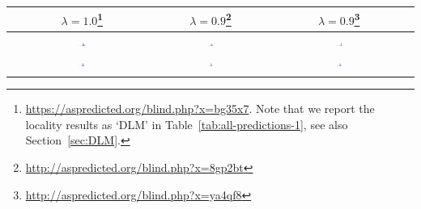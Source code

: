 \documentclass[10pt,twoside,lineno]{article}
\begin{document}
\begin{table}[hbt!]
	\begin{center}
\small{
\begin{tabular}{|c|ccc|c}
	\hline
& $\lambda=1.0$\footnote{\url{https://aspredicted.org/blind.php?x=bg35x7}. Note that we report the locality results as `DLM' in Table~\ref{tab:all-predictions-1}, see also Section~\ref{sec:DLM}.} 
& $\lambda=0.9$\footnote{\url{http://aspredicted.org/blind.php?x=8gp2bt}}
& $\lambda=0.9$\footnote{\url{http://aspredicted.org/blind.php?x=ya4qf8}} \\ \hline \hline 
	\multirow{2}{*}{\raisebox{.5pt}{\textcircled{\raisebox{-.9pt} {1}}}}		  
		&   \multirow{2}{*}{  \includegraphics[width=0.06\textwidth]{../results/correlations/figures/posteriors/posterior_first10_Efficiency_lifted_case.pdf}     } 
 		&   \multirow{2}{*}{  \includegraphics[width=0.06\textwidth]{../results/correlations/figures/posteriors/posterior_first09_Efficiency_lifted_case.pdf}     }  
		&   \multirow{2}{*}{  \includegraphics[width=0.06\textwidth]{../results/correlations/figures/posteriors/posterior_Efficiency_lifted_case.pdf}     }  \\
&&&\\ \hline
	\multirow{2}{*}{\raisebox{.5pt}{\textcircled{\raisebox{-.9pt} {2}}}}	 
		&   \multirow{2}{*}{  \includegraphics[width=0.06\textwidth]{../results/correlations/figures/posteriors/posterior_first10_Efficiency_lifted_cop.pdf}     }  
		&   \multirow{2}{*}{  \includegraphics[width=0.06\textwidth]{../results/correlations/figures/posteriors/posterior_first09_Efficiency_lifted_cop.pdf}     }  
		&   \multirow{2}{*}{  \includegraphics[width=0.06\textwidth]{../results/correlations/figures/posteriors/posterior_Efficiency_lifted_cop.pdf}     }  \\
&&&\\ \hline
	\multirow{2}{*}{\raisebox{.5pt}{\textcircled{\raisebox{-.9pt} {3}}}}	 

\end{tabular}}
\end{center}
\end{table}
\end{document}
